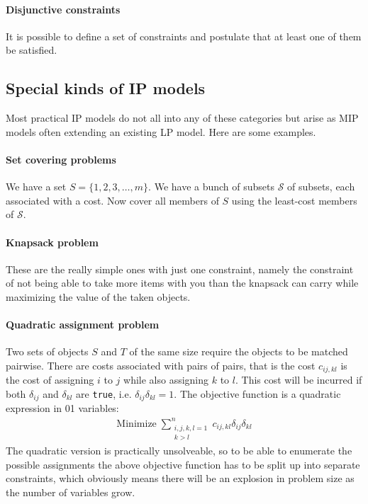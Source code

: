 \documentclass[13pt, letterpaper, twoside]{book}
\begin{document}
\paragraph*{Disjunctive constraints}
It is possible to define a set of constraints and postulate that at least one of them be satisfied.

\subsection{Special kinds of IP models}
Most practical IP models do not all into any of these categories but arise as MIP models often extending an existing LP model. Here are some examples.

\paragraph*{Set covering problems} We have a set $S = \{1,2,3,\dots,m\}$. We have a bunch of subsets $\mathcal{S}$ of subsets, each associated with a cost. Now cover all members of $S$ using the least-cost members of $\mathcal{S}$.

\paragraph*{Knapsack problem} These are the really simple ones with just one constraint, namely the constraint of not being able to take more items with you than the knapsack can carry while maximizing the value of the taken objects.

\paragraph*{Quadratic assignment problem} Two sets of objects $S$ and $T$ of the same size require the objects to be matched pairwise. There are costs associated with pairs of pairs, that is the cost $c_{ij,kl}$ is the cost of assigning $i$ to $j$ while also assigning $k$ to $l$. This cost will be incurred if both $\delta_{ij}$ and $\delta_{kl}$ are \texttt{true}, i.e. $\delta_{ij}\delta_{kl} = 1$. The objective function is a quadratic expression in 01 variables:
\begin{align}
\mathrm{Minimize}\;\sum^n_{\substack{i,j,k,l=1\\k>l}} c_{ij,kl}\delta_{ij}\delta_{kl}
\end{align}
The quadratic version is practically unsolveable, so to be able to enumerate the possible assignments the above objective function has to be split up into separate constraints, which obviously means there will be an explosion in problem size as the number of variables grow.
\end{document}
